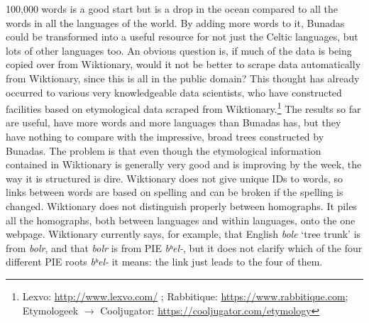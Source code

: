 \documentclass[output=paper,colorlinks,citecolor=brown]{langscibook}
\begin{document}
100,000 words is a good start but is a drop in the ocean compared to all the words in all the languages of the world. By adding more words to it, Bunadas could be transformed into a useful resource for not just the Celtic languages, but lots of other languages too. An obvious question is, if much of the data is being copied over from Wiktionary, would it not be better to scrape data automatically from Wiktionary, since this is all in the public domain? This thought has already occurred to various very knowledgeable data scientists, who have constructed facilities based on etymological data scraped from Wiktionary.\footnote{Lexvo: \url{http://www.lexvo.com/} \citep{cod:DeMelo2015}; Rabbitique: \url{https://www.rabbitique.com}; Etymologeek $\rightarrow$ Cooljugator: 
\url{https://cooljugator.com/etymology}} The results so far are useful, have more words and more languages than Bunadas has, but they have nothing to compare with the impressive, broad trees constructed by Bunadas. The problem is that even though the etymological information contained in Wiktionary is generally very good and is improving by the week, the way it is structured is dire. Wiktionary does not give unique IDs to words, so links between words are based on spelling and can be broken if the spelling is changed. Wiktionary does not distinguish properly between homographs. It piles all the homographs, both between languages and within languages, onto the one webpage. Wiktionary currently says, for example, that English \textit{bole} ‘tree trunk’ is from  \textit{bolr}, and that \textit{bolr} is from PIE \textit{bʰel-}, but it does not clarify which of the four different PIE roots \textit{bʰel-} it means: the link just leads to the four of them.
\end{document}
